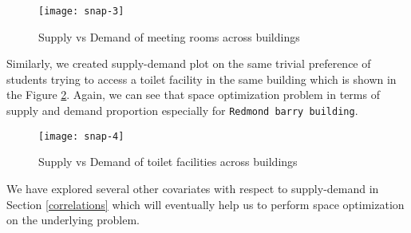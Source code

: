 \begin{figure}[H]
\centering
\texttt{[image: snap-3]}
\caption{Supply vs Demand of meeting rooms across buildings}
\label{fig:expo-image-3}
\end{figure}

 Similarly, we created supply-demand plot on the same trivial preference of students trying to access a toilet facility in the same building which is shown in the Figure \ref{fig:expo-image-4}. Again, we can see that space optimization problem in terms of supply and demand proportion especially for \texttt{Redmond barry building}.
 
\begin{figure}[H]
\centering
\texttt{[image: snap-4]}
\caption{Supply vs Demand of toilet facilities across buildings}
\label{fig:expo-image-4}
\end{figure}

We have explored several other covariates with respect to supply-demand in Section \ref{correlations} which will eventually help us to perform space optimization on the underlying problem.
